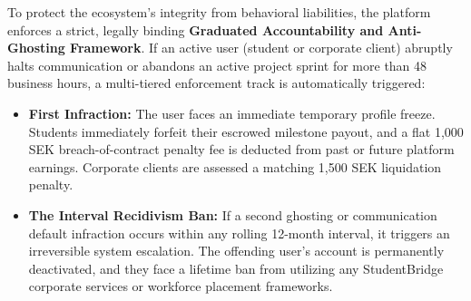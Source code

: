 \documentclass[12pt,a4paper]{article}
\begin{document}
To protect the ecosystem's integrity from behavioral liabilities, the platform enforces a strict, legally binding \textbf{Graduated Accountability and Anti-Ghosting Framework}. If an active user (student or corporate client) abruptly halts communication or abandons an active project sprint for more than 48 business hours, a multi-tiered enforcement track is automatically triggered:
\begin{itemize}
    \item \textbf{First Infraction:} The user faces an immediate temporary profile freeze. Students immediately forfeit their escrowed milestone payout, and a flat 1,000 SEK breach-of-contract penalty fee is deducted from past or future platform earnings. Corporate clients are assessed a matching 1,500 SEK liquidation penalty.
    \item \textbf{The Interval Recidivism Ban:} If a second ghosting or communication default infraction occurs within any rolling 12-month interval, it triggers an irreversible system escalation. The offending user's account is permanently deactivated, and they face a lifetime ban from utilizing any StudentBridge corporate services or workforce placement frameworks.
\end{itemize}
\end{document}
